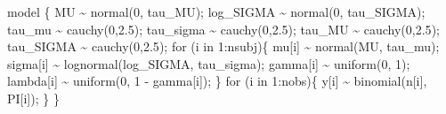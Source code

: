 \documentclass[
  letterpaper,
  DIV=11,
  numbers=noendperiod]{scrartcl}
\newenvironment{Shaded}{\begin{snugshade}}{\end{snugshade}}
\newcommand{\ControlFlowTok}[1]{\textcolor[rgb]{0.00,0.23,0.31}{#1}}
\newcommand{\DecValTok}[1]{\textcolor[rgb]{0.68,0.00,0.00}{#1}}
\newcommand{\FloatTok}[1]{\textcolor[rgb]{0.68,0.00,0.00}{#1}}
\newcommand{\KeywordTok}[1]{\textcolor[rgb]{0.00,0.23,0.31}{#1}}
\newcommand{\NormalTok}[1]{\textcolor[rgb]{0.00,0.23,0.31}{#1}}
\begin{document}
\begin{Shaded}
\begin{Highlighting}[]
\KeywordTok{model}\NormalTok{ \{}
\NormalTok{  MU \textasciitilde{} normal(}\DecValTok{0}\NormalTok{, tau\_MU);}
\NormalTok{  log\_SIGMA \textasciitilde{} normal(}\DecValTok{0}\NormalTok{, tau\_SIGMA);}
\NormalTok{  tau\_mu \textasciitilde{} cauchy(}\DecValTok{0}\NormalTok{,}\FloatTok{2.5}\NormalTok{);}
\NormalTok{  tau\_sigma \textasciitilde{} cauchy(}\DecValTok{0}\NormalTok{,}\FloatTok{2.5}\NormalTok{);}
\NormalTok{  tau\_MU \textasciitilde{} cauchy(}\DecValTok{0}\NormalTok{,}\FloatTok{2.5}\NormalTok{);}
\NormalTok{  tau\_SIGMA \textasciitilde{} cauchy(}\DecValTok{0}\NormalTok{,}\FloatTok{2.5}\NormalTok{);}
  \ControlFlowTok{for}\NormalTok{ (i }\ControlFlowTok{in} \DecValTok{1}\NormalTok{:nsubj)\{}
\NormalTok{    mu[i] \textasciitilde{} normal(MU, tau\_mu);}
\NormalTok{    sigma[i] \textasciitilde{} lognormal(log\_SIGMA, tau\_sigma);}
\NormalTok{    gamma[i] \textasciitilde{} uniform(}\DecValTok{0}\NormalTok{, }\DecValTok{1}\NormalTok{);}
\NormalTok{    lambda[i] \textasciitilde{} uniform(}\DecValTok{0}\NormalTok{, }\DecValTok{1}\NormalTok{ {-} gamma[i]);}
\NormalTok{  \}}
  \ControlFlowTok{for}\NormalTok{ (i }\ControlFlowTok{in} \DecValTok{1}\NormalTok{:nobs)\{}
\NormalTok{    y[i] \textasciitilde{} binomial(n[i], PI[i]);}
\NormalTok{  \}}
\NormalTok{\}}
\end{Highlighting}
\end{Shaded}
\end{document}
